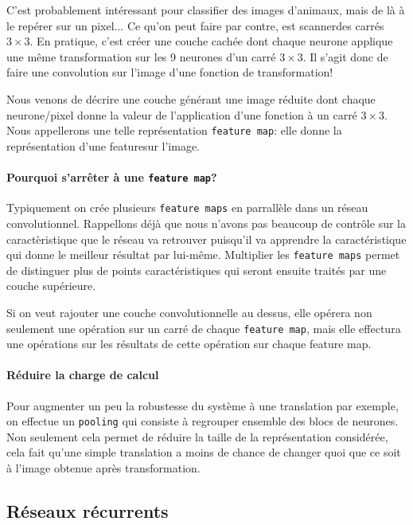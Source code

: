 \documentclass[a4paper,11pt, twocolumn]{article}
\begin{document}
C'est probablement intéressant pour classifier des images d'animaux, mais de là
à le repérer sur un pixel... Ce qu'on peut faire par contre, est \og
scanner\fg des carrés $3\times 3$. En pratique, c'est créer une couche cachée
dont chaque neurone applique une même transformation sur les 9 neurones d'un
carré $3\times 3$. Il s'agit donc de faire une convolution sur l'image d'une
fonction de transformation!

Nous venons de décrire une couche générant une image réduite dont chaque
neurone/pixel donne la valeur de l'application d'une fonction à un carré
$3\times 3$. Nous appellerons une telle représentation \texttt{feature map}:
elle donne la représentation d'une \og feature\fg sur l'image.

\paragraph{Pourquoi s'arrêter à une \texttt{feature map}?}

Typiquement on crée plusieurs \texttt{feature maps} en parrallèle dans un réseau
convolutionnel. Rappellons déjà que nous n'avons pas beaucoup de contrôle sur la
caractèristique que le réseau va retrouver puisqu'il va apprendre la
caractéristique qui donne le meilleur résultat par lui-même. Multiplier les
\texttt{feature maps} permet de distinguer plus de points caractéristiques qui
seront ensuite traités par une couche supérieure.

Si on veut rajouter une couche convolutionnelle au dessus, elle opérera non
seulement une opération sur un carré de chaque \texttt{feature map}, mais elle
effectura une opérations sur les résultats de cette opération sur chaque feature
map.

\paragraph{Réduire la charge de calcul}

Pour augmenter un peu la robustesse du système à une translation par exemple, on
effectue un \texttt{pooling} qui consiste à regrouper ensemble des blocs de
neurones. Non seulement cela permet de réduire la taille de la représentation
considérée, cela fait qu'une simple translation a moins de chance de changer
quoi que ce soit à l'image obtenue après transformation.

\subsection{Réseaux récurrents}
\end{document}
